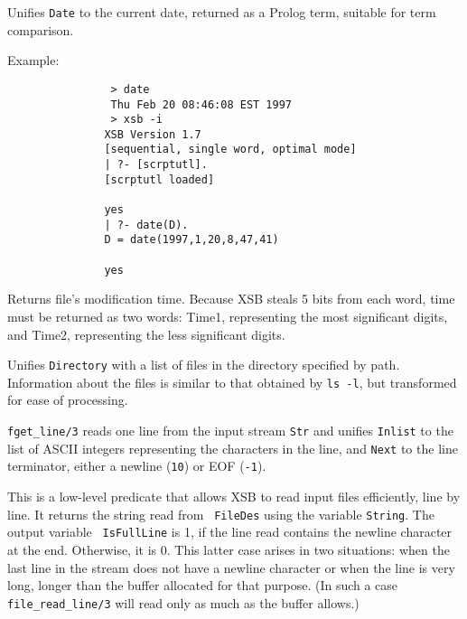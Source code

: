 \begin{description}
	Unifies {\tt Date} to the current date, returned as a Prolog
term, suitable for term comparison.

Example:
{\footnotesize
\begin{verbatim}
                > date 
                Thu Feb 20 08:46:08 EST 1997
                > xsb -i
               XSB Version 1.7
               [sequential, single word, optimal mode]
               | ?- [scrptutl].
               [scrptutl loaded]

               yes
               | ?- date(D).
               D = date(1997,1,20,8,47,41)

               yes
\end{verbatim}}


Returns file's modification time. Because 
XSB steals 5 bits from each word, time must be returned as two words:
Time1, representing the most significant digits, and Time2, representing
the less significant digits.


	Unifies {\tt Directory} with a list of files in the directory
specified by path.  Information about the files is similar to that
obtained by {\tt ls -l}, but transformed for ease of processing.


{\tt fget\_line/3} reads one line from the input stream {\tt Str} and
unifies {\tt Inlist} to the list of ASCII integers representing the
characters in the line, and {\tt Next} to the line terminator, either
a newline ({\tt 10}) or EOF ({\tt-1}).

    This is a low-level predicate that allows XSB to read input files
    efficiently, line by line. It returns the string read from {\tt
      FileDes} using the variable {\tt String}. The output variable {\tt
      IsFullLine} is 1, if the line read contains the newline character at
    the end. Otherwise, it is 0. This latter case arises in two situations:
    when the last line in the stream does not have a newline  character or
    when the line is very long, longer than the buffer allocated for that
    purpose. (In such a case {\tt file\_read\_line/3} will read only as
    much as the buffer allows.) 


\end{description}
